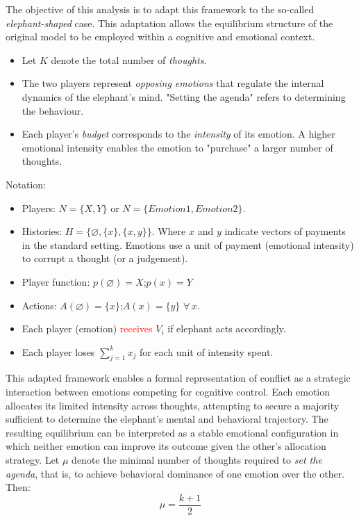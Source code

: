 The objective of this analysis is to adapt this framework to the so-called \textit{elephant-shaped} case.  
This adaptation allows the equilibrium structure of the original model to be employed within a cognitive and emotional context.


\begin{itemize}
    \item Let \( K \) denote the total number of \textit{thoughts}.
    \item The two players represent \textit{opposing emotions} that regulate the internal dynamics of the elephant’s mind.  
    "Setting the agenda" refers to determining the behaviour.
    \item Each player’s \textit{budget} corresponds to the \textit{intensity} of its emotion.  
    A higher emotional intensity enables the emotion to "purchase" a larger number of thoughts.
\end{itemize}

Notation:

\begin{itemize}
  \item[] Players: \(N=\{X,Y\}\) or \(N=\{Emotion 1, Emotion 2\}\).
  \item[] Histories: \(H= \big \{\varnothing,\{x\},\{x,y\}\big \}\). Where \(x\) and \(y\) indicate vectors of payments in the standard setting. Emotions use a unit of payment (emotional intensity) to corrupt a thought (or a judgement).
  \item[] Player function: \(p(\varnothing)=X\);\quad \(p(x)=Y\)
  \item[] Actions: \(A(\varnothing)=\{x\}\);\quad \(A(x)=\{y\}\) \(\forall\,x\).
  \item[] Each player (emotion) \textcolor{red}{receives} \(V_i\) if elephant acts accordingly.
  \item[] Each player loses \(\sum_{j=1}^{k} x_{j}\) for each unit of intensity spent.
\end{itemize}

This adapted framework enables a formal representation of conflict as a strategic interaction between emotions competing for cognitive control.  
Each emotion allocates its limited intensity across thoughts, attempting to secure a majority sufficient to determine the elephant’s mental and behavioral trajectory.  
The resulting equilibrium can be interpreted as a stable emotional configuration in which neither emotion can improve its outcome given the other’s allocation strategy. Let \( \mu \) denote the minimal number of thoughts required to \textit{set the agenda}, that is, to achieve behavioral dominance of one emotion over the other. Then:
\[
\mu=\dfrac{k+1}{2}
\]



